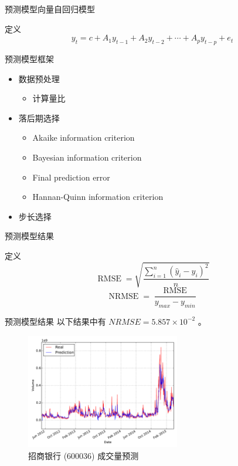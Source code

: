 \documentclass{beamer}
\begin{document}
\begin{frame}{预测模型}{向量自回归模型}
\begin{block}{定义}
  \[
    y_{t}=c+A_{1}y_{t-1}+A_{2}y_{t-2}+\cdots +A_{p}y_{t-p}+e_{t}
  \]
\end{block}
\end{frame}

\begin{frame}{预测模型}{框架}
\begin{itemize}
  \item 数据预处理
  \pause
  \begin{itemize}
    \item 计算量比
  \end{itemize}
  \pause
  \item 落后期选择
  \pause
  \begin{itemize}
    \item Akaike information criterion
    \pause
    \item Bayesian information criterion
    \pause
    \item Final prediction error
    \pause
    \item Hannan-Quinn information criterion
  \end{itemize}
  \pause
  \item 步长选择
\end{itemize}
\end{frame}

\begin{frame}{预测模型}{结果}
\begin{block}{定义}
  \[
    \operatorname{RMSE}=\sqrt{\frac{\sum_{i=1}^{n}(\hat{y}_{i}-y_{i})^{2}}{n}}
  \]
  \[
    \operatorname{NRMSE}=\frac{\operatorname{RMSE}}{y_{max}-y_{min}}
  \]
\end{block}
\end{frame}

\begin{frame}{预测模型}{结果}
以下结果中有 $NRMSE=5.857\times 10^{-2}$ 。

\begin{figure}
  \includegraphics[width=0.6\textwidth]{plots/volume_forecast_regression_line.pdf}
  \caption{招商银行 (600036) 成交量预测}
\end{figure}
\end{frame}
\end{document}
